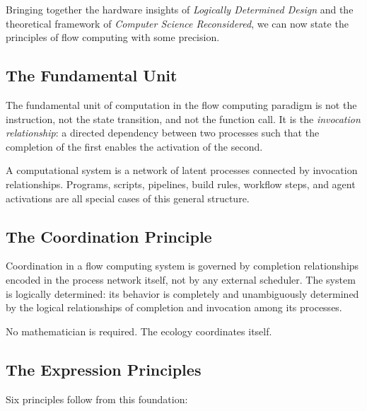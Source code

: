 \documentclass[12pt, a4paper]{article}
\begin{document}
Bringing together the hardware insights of \textit{Logically
Determined Design} and the theoretical framework of
\textit{Computer Science Reconsidered}, we can now state the
principles of flow computing with some precision.

\subsection{The Fundamental Unit}

The fundamental unit of computation in the flow computing paradigm
is not the instruction, not the state transition, and not the
function call. It is the \emph{invocation relationship}: a directed
dependency between two processes such that the completion of the
first enables the activation of the second.

A computational system is a network of latent processes connected
by invocation relationships. Programs, scripts, pipelines, build
rules, workflow steps, and agent activations are all special cases
of this general structure.

\subsection{The Coordination Principle}

Coordination in a flow computing system is governed by completion
relationships encoded in the process network itself, not by any
external scheduler. The system is logically determined: its behavior
is completely and unambiguously determined by the logical
relationships of completion and invocation among its processes.

No mathematician is required. The ecology coordinates itself.

\subsection{The Expression Principles}

Six principles follow from this foundation:
\end{document}
